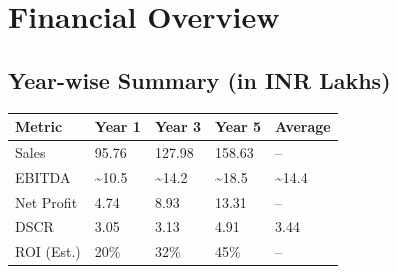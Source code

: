\section{Financial Overview}
\subsection{Year-wise Summary (in INR Lakhs)}
\begin{center}
    
\begin{tabular}{@{}lllll@{}}
\toprule
\textbf{Metric} & \textbf{Year 1} & \textbf{Year 3} & \textbf{Year 5} & \textbf{Average} \\
\midrule
Sales             & 95.76 & 127.98 & 158.63 & -- \\
EBITDA            & \textasciitilde10.5 & \textasciitilde14.2 & \textasciitilde18.5 & \textasciitilde14.4 \\
Net Profit        & 4.74 & 8.93 & 13.31 & -- \\
DSCR              & 3.05 & 3.13 & 4.91 & 3.44 \\
ROI (Est.)        & 20\% & 32\% & 45\% & -- \\
\bottomrule
\end{tabular}
\end{center}